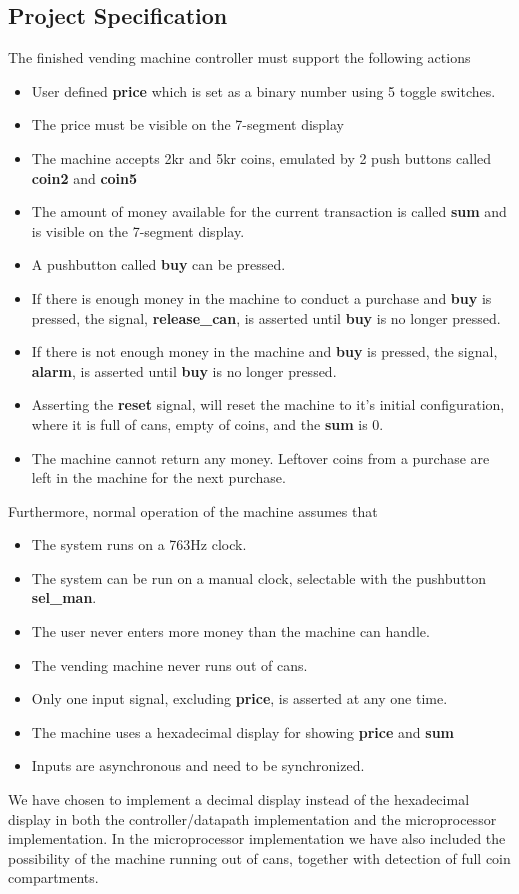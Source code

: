 \subsection{Project Specification}
The finished vending machine controller must support the following actions

\begin{itemize}
    \item User defined \textbf{price} which is set as a binary number using 5 toggle switches.
    \item The price must be visible on the 7-segment display
    \item The machine accepts 2kr and 5kr coins, emulated by 2 push buttons called \textbf{coin2} and \textbf{coin5}
    \item The amount of money available for the current transaction is called \textbf{sum} and is visible on the 7-segment display.
    \item A pushbutton called \textbf{buy} can be pressed.
    \item If there is enough money in the machine to conduct a purchase and \textbf{buy} is pressed, the signal, \textbf{release\_can}, is asserted until \textbf{buy} is no longer pressed.
    \item If there is not enough money in the machine and \textbf{buy} is pressed, the signal, \textbf{alarm}, is asserted until \textbf{buy} is no longer pressed.
    \item Asserting the \textbf{reset} signal, will reset the machine to it's initial configuration, where it is full of cans, empty of coins, and the \textbf{sum} is 0.
    \item The machine cannot return any money. Leftover coins from a purchase are left in the machine for the next purchase.

\end{itemize}

Furthermore, normal operation of the machine assumes that

\begin{itemize}
    \item The system runs on a 763Hz clock.
    \item The system can be run on a manual clock, selectable with the pushbutton \textbf{sel\_man}.
    \item The user never enters more money than the machine can handle.
    \item The vending machine never runs out of cans.
    \item Only one input signal, excluding \textbf{price}, is asserted at any one time.
    \item The machine uses a hexadecimal display for showing \textbf{price} and \textbf{sum}
    \item Inputs are asynchronous and need to be synchronized.
\end{itemize}
We have chosen to implement a decimal display instead of the hexadecimal display in both the controller/datapath implementation and the microprocessor implementation.
In the microprocessor implementation we have also included the possibility of the machine running out of cans, together with detection of full coin compartments.

